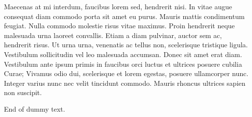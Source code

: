 Maecenas at mi interdum, faucibus lorem sed, hendrerit nisi. In vitae
augue consequat diam commodo porta sit amet eu purus. Mauris mattis
condimentum feugiat. Nulla commodo molestie risus vitae maximus. Proin
hendrerit neque malesuada urna laoreet convallis. Etiam a diam
pulvinar, auctor sem ac, hendrerit risus. Ut urna urna, venenatis ac
tellus non, scelerisque tristique ligula. Vestibulum sollicitudin vel
leo malesuada accumsan. Donec sit amet erat diam. Vestibulum ante
ipsum primis in faucibus orci luctus et ultrices posuere cubilia
Curae; Vivamus odio dui, scelerisque et lorem egestas, posuere
ullamcorper nunc. Integer varius nunc nec velit tincidunt
commodo. Mauris rhoncus ultrices sapien non suscipit.


End of dummy text.


\endinput
